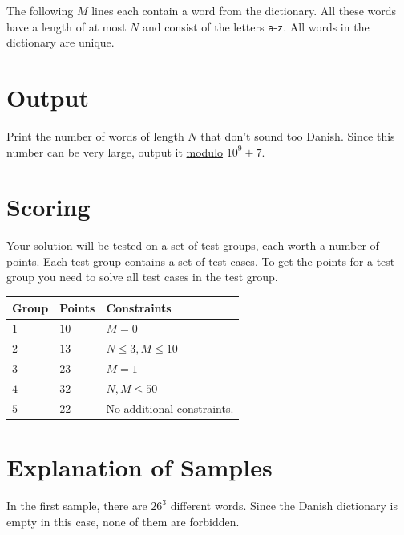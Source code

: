 The following $M$ lines each contain a word from the dictionary. All these words have a length of at most $N$ 
and consist of the letters \texttt{a}-\texttt{z}. All words in the dictionary are unique.

\section*{Output}
Print the number of words of length $N$ that don't sound too Danish. Since this number can be very large, 
output it \href{https://en.wikipedia.org/wiki/Modulo}{modulo} $10^9+7$. 

\section*{Scoring}
Your solution will be tested on a set of test groups, each worth a number of points. Each test group contains
a set of test cases. To get the points for a test group you need to solve all test cases in the test group.

\noindent
\begin{tabular}{| l | l | p{12cm} |}
  \hline
  \textbf{Group} & \textbf{Points} & \textbf{Constraints} \\ \hline
  $1$    & $10$       & $M = 0$ \\ \hline
  $2$    & $13$       & $N \leq 3, M \leq 10$ \\ \hline
  $3$    & $23$       & $M = 1$ \\ \hline
  $4$    & $32$       & $N, M \leq 50$ \\ \hline
  $5$    & $22$       & No additional constraints. \\ \hline
\end{tabular}

\section*{Explanation of Samples}
In the first sample, there are $26^3$ different words. Since the Danish dictionary is empty in this case, none
of them are forbidden.
